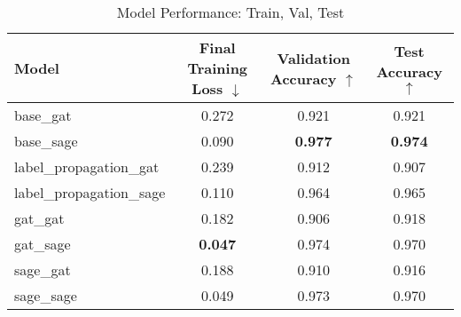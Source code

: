\documentclass{article}
\begin{document}
\newcommand{\best}[1]{\cellcolor{gray!30}\textbf{#1}}

\begin{table}[ht]
\centering
\caption{Model Performance: Train, Val, Test}
\begin{tabular}{lccc}
\toprule
\textbf{Model} & \textbf{Final Training Loss $\downarrow$} & \textbf{Validation Accuracy $\uparrow$} & \textbf{Test Accuracy $\uparrow$} \\
\midrule
base\_gat & 0.272 & 0.921 & 0.921 \\
base\_sage & 0.090 & \best{0.977} & \best{0.974} \\
label\_propagation\_gat & 0.239 & 0.912 & 0.907 \\
label\_propagation\_sage & 0.110 & 0.964 & 0.965 \\
gat\_gat & 0.182 & 0.906 & 0.918 \\
gat\_sage & \best{0.047} & 0.974 & 0.970 \\
sage\_gat & 0.188 & 0.910 & 0.916 \\
sage\_sage & 0.049 & 0.973 & 0.970 \\
\bottomrule
\end{tabular}
\end{table}
\end{document}
